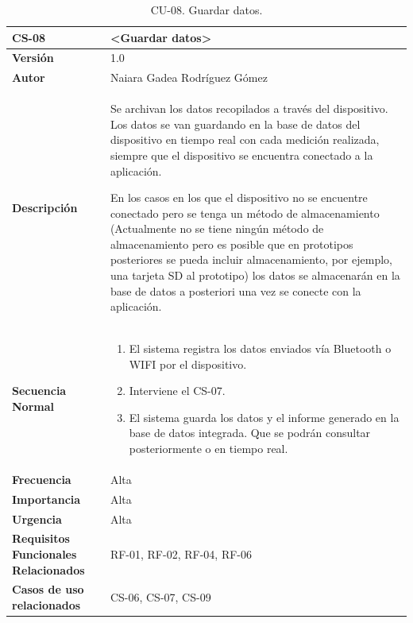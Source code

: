 \begin{table}[h!]
\centering
\begin{tabular}{ |m{3cm}|m{11cm}|  } 
\hline
\cellcolor[HTML]{B9E3F0}\textbf{CS-08} & \cellcolor[HTML]{B9E3F0}\textbf{<Guardar datos>}\\

\hline
\cellcolor[HTML]{EFEFEF}\textbf{Versión}             & 1.0  \\
\hline
\cellcolor[HTML]{EFEFEF}\textbf{Autor}                & Naiara Gadea Rodríguez Gómez\\
\hline
\cellcolor[HTML]{EFEFEF}\textbf{Descripción}                & {Se archivan los datos recopilados a través del dispositivo. Los datos se van guardando en la base de datos del dispositivo en tiempo real con cada medición realizada, siempre que el dispositivo se encuentra conectado a la aplicación. 

En los casos en los que el dispositivo no se encuentre conectado pero se tenga un método de almacenamiento (Actualmente no se tiene ningún método de almacenamiento pero es posible que en prototipos posteriores se pueda incluir almacenamiento, por ejemplo, una tarjeta SD al prototipo) los datos se almacenarán en la base de datos a posteriori una vez se conecte con la aplicación.}\\
\hline
\cellcolor[HTML]{EFEFEF}\textbf{Secuencia \newline Normal}                &                 
        \begin{enumerate}
			\def\labelenumi{\arabic{enumi}.}
			\tightlist
			\item El sistema registra los datos enviados vía Bluetooth o WIFI por el dispositivo.
			\item Interviene el CS-07.
                \item El sistema guarda los datos y el informe generado en la base de datos integrada. Que se podrán consultar posteriormente o en tiempo real.
		\end{enumerate}\\
\hline
\cellcolor[HTML]{EFEFEF}\textbf{Frecuencia}                & Alta\\
\hline
\cellcolor[HTML]{EFEFEF}\textbf{Importancia}                & Alta\\
\hline
\cellcolor[HTML]{EFEFEF}\textbf{Urgencia}                & Alta\\
\hline
\cellcolor[HTML]{EFEFEF}\textbf{Requisitos Funcionales Relacionados}                & {RF-01, RF-02, RF-04, RF-06} \\
\hline
\cellcolor[HTML]{EFEFEF}\textbf{Casos de uso relacionados}                & {CS-06, CS-07, CS-09}\\
\hline
\end{tabular}
\caption{CU-08. Guardar datos.}
\end{table}

